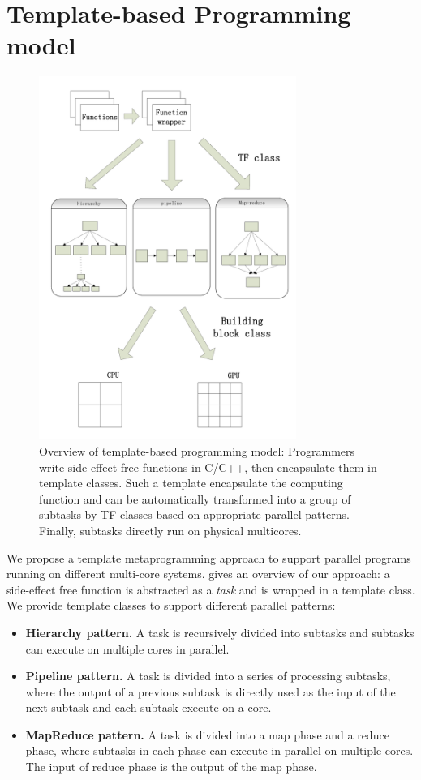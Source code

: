 \section{Template-based Programming model}
\label{sec:model}

\begin{figure}[htb]
\includegraphics[width=3.3in]{../overview}
\caption{Overview of template-based programming model: Programmers
write side-effect free functions in C/C++, then encapsulate them in
template classes. Such a template encapsulate the computing function and can be 
automatically transformed into a
group of subtasks by TF classes based on appropriate parallel patterns. Finally,
subtasks directly run on physical multicores.}
\label{fig:overview}
\end{figure}

We propose a template metaprogramming approach to support parallel programs
running on different multi-core systems.  gives an overview
of our approach: a side-effect free function is abstracted as a \emph{task}
and is wrapped in a template class. We provide template classes
to support different parallel patterns:

\begin{itemize}
\item \textbf{Hierarchy pattern.} A task is recursively divided into subtasks
and subtasks can execute on multiple cores in parallel.

\item \textbf{Pipeline pattern.} A task is divided into a series of processing
subtasks, where the output of a previous subtask is directly used as the input
of the next subtask and each subtask execute on a core.

\item \textbf{MapReduce pattern.} A task is divided into a map phase and a
reduce phase, where subtasks in each phase can execute in parallel on multiple
cores. The input of reduce phase is the output of the map phase.

\end{itemize}

